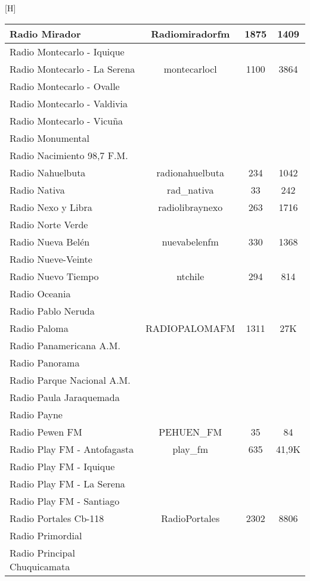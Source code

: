 \begin{center}[H]
\begin{longtable}{| l | c | c | c |}
Radio Mirador	&	Radiomiradorfm	&	1875	&	1409	\\ \hline
Radio Montecarlo - Iquique	&		&		&		\\ \hline
Radio Montecarlo - La Serena	&	montecarlocl	&	1100	&	3864	\\ \hline
Radio Montecarlo - Ovalle	&		&		&		\\ \hline
Radio Montecarlo - Valdivia	&		&		&		\\ \hline
Radio Montecarlo - Vicuña	&		&		&		\\ \hline
Radio Monumental	&		&		&		\\ \hline
Radio Nacimiento 98,7 F.M.	&		&		&		\\ \hline
Radio Nahuelbuta	&	radionahuelbuta	&	234	&	1042	\\ \hline
Radio Nativa	&	rad\_nativa	&	33	&	242	\\ \hline
Radio Nexo y Libra	&	radiolibraynexo	&	263	&	1716	\\ \hline
Radio Norte Verde	&		&		&		\\ \hline
Radio Nueva Belén	&	nuevabelenfm	&	330	&	1368	\\ \hline
Radio Nueve-Veinte	&		&		&		\\ \hline
Radio Nuevo Tiempo	&	ntchile	&	294	&	814	\\ \hline
Radio Oceania	&		&		&		\\ \hline
Radio Pablo Neruda	&		&		&		\\ \hline
Radio Paloma	&	RADIOPALOMAFM	&	1311	&	27K	\\ \hline
Radio Panamericana A.M.	&		&		&		\\ \hline
Radio Panorama	&		&		&		\\ \hline
Radio Parque Nacional A.M.	&		&		&		\\ \hline
Radio Paula Jaraquemada	&		&		&		\\ \hline
Radio Payne	&		&		&		\\ \hline
Radio Pewen FM	&	PEHUEN\_FM	&	35	&	84	\\ \hline
Radio Play FM - Antofagasta	&	play\_fm	&	635	&	41,9K	\\ \hline
Radio Play FM - Iquique	&		&		&		\\ \hline
Radio Play FM - La Serena	&		&		&		\\ \hline
Radio Play FM - Santiago	&		&		&		\\ \hline
Radio Portales Cb-118	&	RadioPortales	&	2302	&	8806	\\ \hline
Radio Primordial	&		&		&		\\ \hline
Radio Principal Chuquicamata	&		&		&		\\ \hline

\end{longtable}
\end{center}
